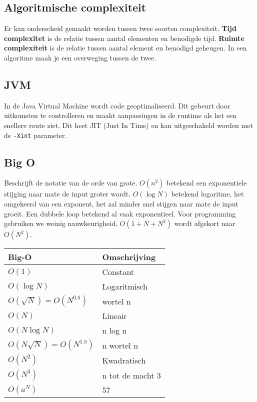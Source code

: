 \subsection{Algoritmische complexiteit}
Er kan onderscheid gemaakt worden tussen twee soorten complexiteit.
\textbf{Tijd complexitet} is de relatie tussen aantal elementen en benodigde tijd.
\textbf{Ruimte complexiteit} is de relatie tussen aantal element en benodigd geheugen.
In een algoritme maak je een overweging tussen de twee.

\subsection{JVM}
In de Java Virtual Machine wordt code geoptimaliseerd.
Dit gebeurt door uitkomsten te controlleren en maakt aanpassingen in de runtime als het een snellere route ziet.
Dit heet JIT (Just In Time) en kan uitgeschakeld worden met de \texttt{-Xint} parameter.

\subsection{Big O}
Beschrijft de notatie van de orde van grote.
$O(n^2)$ betekend een exponentiele stijging naar mate de input groter wordt.
$O(\log N)$ betekend logaritme, het omgekeerd van een exponent, het zal minder snel stijgen naar mate de input groeit.
Een dubbele loop betekend al vaak exponentieel.
Voor programming gebruiken we weinig nauwkeurigheid, $O(1+N+N^2)$ wordt afgekort naar $O(N^2)$.

\begin{center}
    \begin{tabular}{ll}
        Big-O                           & Omschrijving \\
        \midrule
        $O(1)$                          & Constant \\
        $O(\log N)$                     & Logaritmisch \\
        $O(\sqrt{N}) = O(N^{0.5})$      & wortel n \\
        $O(N)$                          & Lineair \\
        $O(N \log N)$                   & n log n \\
        $O(N \sqrt{N}) = O(N^{1.5})$    & n wortel n \\
        $O(N^2)$                        & Kwadratisch \\
        $O(N^3)$                        & n tot de macht 3 \\
        $O(a^N)$                        & 57 \\
        \bottomrule
    \end{tabular}
\end{center}
